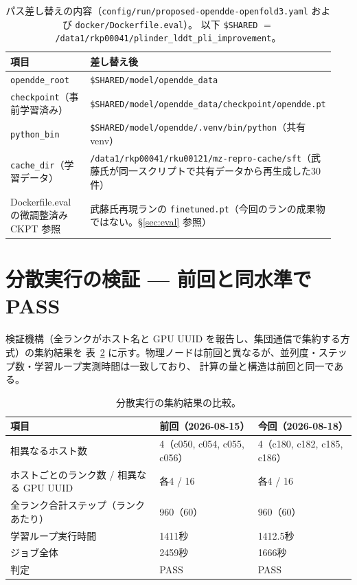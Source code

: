 \documentclass[11pt]{article}
\begin{document}
\begin{table}[h]
\centering
\caption{パス差し替えの内容（\texttt{config/run/proposed-opendde-openfold3.yaml} および \texttt{docker/Dockerfile.eval}）。
以下 \texttt{\$SHARED} $=$ \texttt{/data1/rkp00041/plinder\_lddt\_pli\_improvement}。}
\label{tab:paths}
\small
\begin{tabular}{@{}p{0.38\linewidth}p{0.56\linewidth}@{}}
\toprule
項目 & 差し替え後 \\
\midrule
\texttt{opendde\_root} & \texttt{\$SHARED/model/opendde\_data} \\
\texttt{checkpoint}（事前学習済み） & \texttt{\$SHARED/model/opendde\_data/checkpoint/opendde.pt} \\
\texttt{python\_bin} & \texttt{\$SHARED/model/opendde/.venv/bin/python}（共有 venv） \\
\texttt{cache\_dir}（学習データ） & \texttt{/data1/rkp00041/rku00121/mz-repro-cache/sft}（武藤氏が同一スクリプトで共有データから再生成した30件） \\
Dockerfile.eval の微調整済み CKPT 参照 & 武藤氏再現ランの \texttt{finetuned.pt}（今回のランの成果物ではない。\S\ref{sec:eval} 参照） \\
\bottomrule
\end{tabular}
\end{table}

\section{分散実行の検証 --- 前回と同水準で PASS}
\label{sec:validation}

検証機構（全ランクがホスト名と GPU UUID を報告し、集団通信で集約する方式）の集約結果を
表~\ref{tab:placement} に示す。物理ノードは前回と異なるが、並列度・ステップ数・学習ループ実測時間は一致しており、
計算の量と構造は前回と同一である。

\begin{table}[h]
\centering
\caption{分散実行の集約結果の比較。}
\label{tab:placement}
\small
\begin{tabular}{@{}lll@{}}
\toprule
項目 & 前回（2026-08-15） & 今回（2026-08-18） \\
\midrule
相異なるホスト数 & 4（c050, c054, c055, c056） & 4（c180, c182, c185, c186） \\
ホストごとのランク数 / 相異なる GPU UUID & 各4 / 16 & 各4 / 16 \\
全ランク合計ステップ（ランクあたり） & 960（60） & 960（60） \\
学習ループ実行時間 & 1411秒 & 1412.5秒 \\
ジョブ全体 & 2459秒 & 1666秒 \\
判定 & PASS & PASS \\
\bottomrule
\end{tabular}
\end{table}
\end{document}
